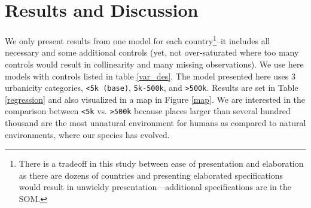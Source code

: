 \documentclass[11pt, letterpaper]{article}
\begin{document}







\section*{Results and Discussion}

%
We only present results from one model for each country\footnote{There is a tradeoff in this study between ease of presentation and
elaboration as there are dozens of countries and presenting elaborated
specifications would result in unwieldy presentation---additional specifications
are in the SOM.}--it includes all necessary and some additional controls (yet, not over-saturated
where too many controls would result in collinearity and  many missing
observations). We use here models with controls listed in table
\ref{var_des}. 
 The model presented here uses 3 urbanicity categories, \texttt{<5k (base)}, \texttt{5k-500k},
 and \texttt{>500k}. Results are set in Table \ref{regression} and also visualized in
 a map in Figure \ref{map}.
 We are interested in
 the comparison between \texttt{<5k} vs. \texttt{>500k} because places larger than several
 hundred thousand %
 are the most unnatural environment for humans as compared to natural
 environments, where our species has evolved.%
\end{document}
